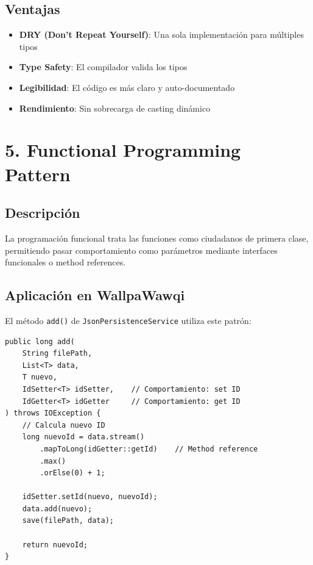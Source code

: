 \documentclass[12pt, a4paper]{report}
\begin{document}
\subsection{Ventajas}

\begin{itemize}
    \item \textbf{DRY (Don't Repeat Yourself)}: Una sola implementación para múltiples tipos
    \item \textbf{Type Safety}: El compilador valida los tipos
    \item \textbf{Legibilidad}: El código es más claro y auto-documentado
    \item \textbf{Rendimiento}: Sin sobrecarga de casting dinámico
\end{itemize}

\newpage

\section{5. Functional Programming Pattern}

\subsection{Descripción}

La programación funcional trata las funciones como ciudadanos de primera clase, permitiendo pasar comportamiento como parámetros mediante interfaces funcionales o method references.

\subsection{Aplicación en WallpaWawqi}

El método \texttt{add()} de \texttt{JsonPersistenceService} utiliza este patrón:

\begin{verbatim}
public long add(
    String filePath,
    List<T> data,
    T nuevo,
    IdSetter<T> idSetter,    // Comportamiento: set ID
    IdGetter<T> idGetter     // Comportamiento: get ID
) throws IOException {
    // Calcula nuevo ID
    long nuevoId = data.stream()
        .mapToLong(idGetter::getId)    // Method reference
        .max()
        .orElse(0) + 1;

    idSetter.setId(nuevo, nuevoId);
    data.add(nuevo);
    save(filePath, data);

    return nuevoId;
}
\end{verbatim}
\end{document}
